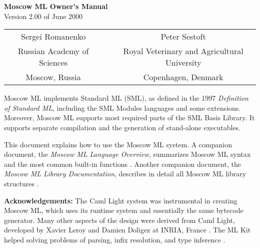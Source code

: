 \documentclass[fleqn]{article}
\begin{document}
\begin{center}

  {\huge\bf Moscow ML Owner's Manual}\\[0.5cm]

Version 2.00 of June 2000\\[0.7cm]

\begin{tabular}{ccc}
\large Sergei Romanenko && \large Peter Sestoft\\
Russian Academy of Sciences && Royal Veterinary and Agricultural University\\
Moscow, Russia && Copenhagen, Denmark
\end{tabular}

\end{center}

\vspace{0.5cm}

\noindent 
Moscow ML implements Standard ML (SML), as defined in the 1997 {\em
  Definition of Standard ML\/}, including the SML Modules languages
and some extensions.  Moreover, Moscow ML supports most required parts
of the SML Basis Library.  It supports separate compilation and the
generation of stand-alone executables.

This document explains how to use the Moscow ML system.  A companion
document, the {\em Moscow ML Language Overview\/}, summarizes Moscow
ML syntax and the most common built-in functions
\cite{MoscowML:2000:MoscowMLLanguage}.  Another companion document,
the \emph{Moscow ML Library Documentation}, describes in detail all
Moscow ML library structures \cite{MoscowML:2000:MoscowMLLibrary}. 

{\bf Acknowledgements:} The Caml Light system was instrumental in
creating Moscow ML, which uses its runtime system and essentially the
same bytecode generator.  Many other aspects of the design were
derived from Caml Light, developed by Xavier Leroy and Damien Doligez
at INRIA, France \cite{Leroy:1990:TheZinc,Leroy:1993:TheCaml}.  The ML
Kit helped solving problems of parsing, infix resolution, and type
inference \cite{Birkedal:1993:TheML}.
\end{document}
